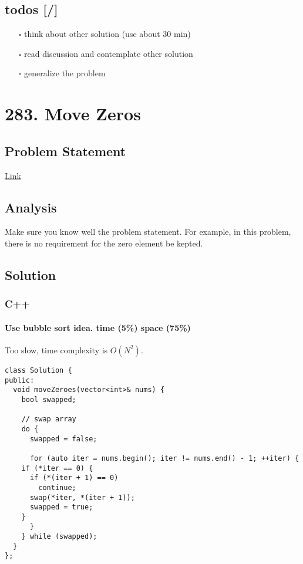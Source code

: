 \documentclass[12pt]{book}
\begin{document}
\section{todos [/]}
\label{sec:org2e7f12f}
\begin{itemize}
\item[{$\square$}] think about other solution (use about 30 min)
\item[{$\square$}] read discussion and contemplate other solution
\item[{$\square$}] generalize the problem
\end{itemize}
\chapter{283. Move Zeros}
\label{sec:org0b00978}
\section{Problem Statement}
\label{sec:org86b22e7}
\href{https://leetcode.com/problems/move-zeroes/}{Link}
\section{Analysis}
\label{sec:org3244492}
Make sure you know well the problem statement. For example, in this problem, there is no requirement for the zero element be kepted.
\section{Solution}
\label{sec:org3d04b60}
\subsection{C++}
\label{sec:org47d18d1}
\subsubsection{Use bubble sort idea. time (5\%) space (75\%)}
\label{sec:org287da92}
Too slow, time complexity is \(O(N^2)\).
\begin{verbatim}
class Solution {
public:
  void moveZeroes(vector<int>& nums) {
    bool swapped;

    // swap array    
    do {
      swapped = false;      

      for (auto iter = nums.begin(); iter != nums.end() - 1; ++iter) {
	if (*iter == 0) {
	  if (*(iter + 1) == 0)
	    continue;
	  swap(*iter, *(iter + 1));
	  swapped = true;
	}   
      }     
    } while (swapped);
  }
};
\end{verbatim}
\end{document}
